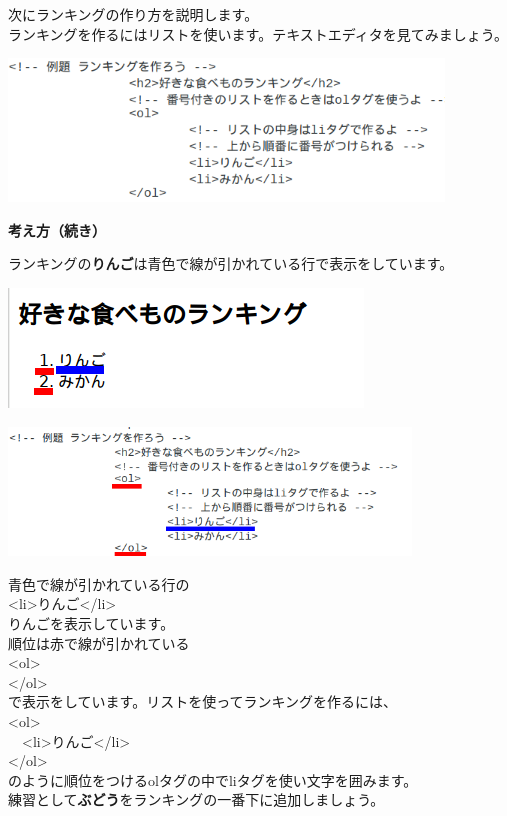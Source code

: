 \documentclass[a4paper,12pt]{jarticle}
\begin{document}
\bigskip

次にランキングの作り方を説明します。\\
ランキングを作るにはリストを使います。テキストエディタを見てみましょう。

\centering
\includegraphics[width=11.553cm,height=3.812cm]{textbook-img180.png}

\clearpage
\flushleft
\textbf{考え方（続き）}


\bigskip


ランキングの\textbf{りんご}は青色で線が引かれている行で表示をしています。


\bigskip


\includegraphics[width=9.417cm,height=3.173cm]{textbook-img182.png}


\bigskip


\includegraphics[width=10.694cm,height=3.431cm]{textbook-img181.png}


青色で線が引かれている行の\\
{\textless}li{\textgreater}りんご{\textless}/li{\textgreater}\\
りんごを表示しています。\\
順位は赤で線が引かれている\\
{\textless}ol{\textgreater}\\
{\textless}/ol{\textgreater}\\
で表示をしています。リストを使ってランキングを作るには、\\
{\textless}ol{\textgreater}\\
\ \ {\textless}li{\textgreater}りんご{\textless}/li{\textgreater}\\
{\textless}/ol{\textgreater}\\
のように順位をつけるolタグの中でliタグを使い文字を囲みます。\\
練習として\textbf{ぶどう}をランキングの一番下に追加しましょう。\\
\end{document}
